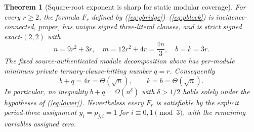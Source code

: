 \documentclass[11pt]{article}
\newtheorem{theorem}{Theorem}
\begin{document}
\begin{theorem}[Square-root exponent is sharp for static modular coverage]\label{thm:tight}
For every $r\ge2$, the formula $F_r$ defined by (\ref{eq:ybridge})--(\ref{eq:pblock}) is incidence-connected, proper, has unique signed three-literal clauses, and is strict signed exact-$(2,2)$ with
\[
n=9r^2+3r,\quad m=12r^2+4r=\frac{4n}{3},\quad b=k=3r.
\]
The fixed source-authenticated module decomposition above has per-module \emph{minimum} private ternary-clause-hitting number $q=r$. Consequently
\[
b+q=4r=\Theta(\sqrt{n}),\qquad k=b=\Theta(\sqrt n).
\]
In particular, no inequality $b+q=\Omega(n^\delta)$ with $\delta>1/2$ holds solely under the hypotheses of (\ref{eq:lower}). Nevertheless every $F_r$ is satisfiable by the explicit period-three assignment $y_i=p_{j,i}=1$ for $i\equiv0,1\pmod3$, with the remaining variables assigned zero.
\end{theorem}
\end{document}
